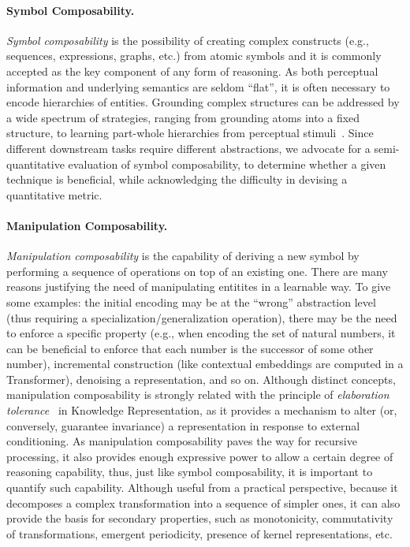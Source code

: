 \paragraph{Symbol Composability.} \textit{Symbol composability} is the possibility of creating complex constructs (e.g., sequences, expressions, graphs, etc.) from atomic symbols and it is commonly accepted as the key component of any form of reasoning. As both perceptual information and underlying semantics are seldom ``flat'', it is often necessary to encode hierarchies of entities. Grounding complex structures can be addressed by a wide spectrum of strategies, ranging from grounding atoms into a fixed structure, to learning part-whole hierarchies from perceptual stimuli~\cite{greff2020binding}. Since different downstream tasks require different abstractions, we advocate for a semi-quantitative evaluation of symbol composability, to determine whether a given technique is beneficial, while acknowledging the difficulty in devising a quantitative metric.

\paragraph{Manipulation Composability.} \textit{Manipulation composability} is the capability of deriving a new symbol by performing a sequence of operations on top of an existing one. There are many reasons justifying the need of manipulating entitites in a learnable way. To give some examples: 
the initial encoding may be at the ``wrong'' abstraction level (thus requiring a specialization/generalization operation), there may be the need to enforce a specific property (e.g., when encoding the set of natural numbers, it can be beneficial to enforce that each number is the successor of some other number), incremental construction (like contextual embeddings are computed in a Transformer), denoising a representation, and so on.
Although distinct concepts, manipulation composability is strongly related with the principle of \textit{elaboration tolerance}~\cite{mccarthy1998elaboration} in Knowledge Representation, as it provides a mechanism to alter (or, conversely, guarantee invariance) a representation in response to external conditioning. As manipulation composability paves the way for recursive processing, it also provides enough expressive power to allow a certain degree of reasoning capability, thus, just like symbol composability, it is important to quantify such capability.
Although useful from a practical perspective, because it decomposes a complex transformation into a sequence of simpler ones, it can also provide the basis for secondary properties, such as monotonicity, commutativity of transformations, emergent periodicity, presence of kernel representations, etc.

